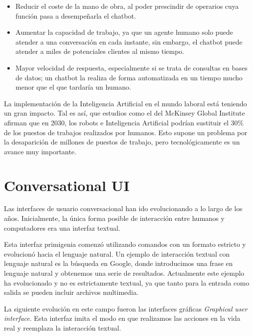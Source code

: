 \begin{itemize}
	\item Reducir el coste de la mano de obra, al poder prescindir de operarios cuya función pasa a desempeñarla el chatbot.
	\item Aumentar la capacidad de trabajo, ya que un agente humano solo puede atender a una conversación en cada instante, sin embargo, el chatbot puede atender a miles de potenciales clientes al mismo tiempo.
	\item Mayor velocidad de respuesta, especialmente si se trata de consultas en bases de datos; un chatbot la realiza de forma automatizada en un tiempo mucho menor que el que tardaría un humano.
\end{itemize}

La implementación de la Inteligencia Artificial en el mundo laboral está teniendo un gran impacto. Tal es así, que estudios como el del McKinsey Global Institute \cite{joblosses} afirman que en 2030, los robots e Inteligencia Artificial podrían sustituir el 30\% de los puestos de trabajos realizados por humanos. Esto supone un problema por la desaparición de millones de puestos de trabajo, pero tecnológicamente es un avance muy importante. 



\newpage

\section{Conversational UI}

Las interfaces de usuario conversacional han ido evolucionando a lo largo de los años. Inicialmente, la única forma posible de interacción entre humanos y computadores era una interfaz textual. 

Esta interfaz primigenia comenzó utilizando comandos con un formato estricto y evolucionó hacia el lenguaje natural. Un ejemplo de interacción textual con lenguaje natural es la búsqueda en Google, donde introducimos una frase en lenguaje natural y obtenemos una serie de resultados. Actualmente este ejemplo ha evolucionado y no es estrictamente textual, ya que tanto para la entrada como salida se pueden incluir archivos multimedia.


La siguiente evolución en este campo fueron las interfaces gráficas \textit{Graphical user interface}. Esta interfaz imita el modo en que realizamos las acciones en la vida real y reemplaza la interacción textual. 

